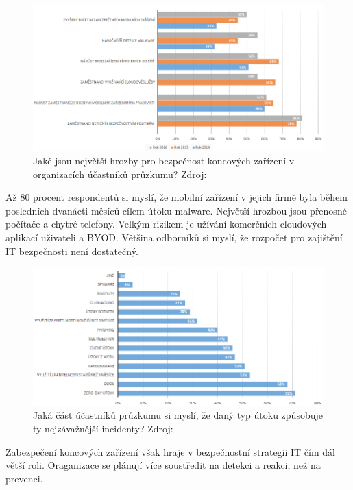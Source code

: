 \begin{figure}[h!]\label{hrozby}
\centering
\includegraphics[width=14cm]{img/hrozby}
\caption{Jaké jsou největší hrozby pro bezpečnost koncových zařízení v organizacích účastníků průzkumu? Zdroj: } 
\end{figure}

Až 80 procent respondentů si myslí, že mobilní zařízení v jejich firmě byla během posledních dvanácti měsíců cílem útoku malware. Největší hrozbou jsou přenosné počítače a chytré telefony. Velkým rizikem je užívání komerčních cloudových aplikací uživateli a BYOD. Většina odborníků si myslí, že rozpočet pro zajištění IT bezpečnosti není dostatečný. 

\begin{figure}[h!]\label{hrozbyUtoky}
\centering
\includegraphics[width=14cm]{img/hrozbyUtoky}
\caption{Jaká část účastníků průzkumu si myslí, že daný typ útoku způsobuje ty nejzávažnější incidenty? Zdroj: } 
\end{figure}

Zabezpečení koncových zařízení však hraje v bezpečnostní strategii IT čím dál větší roli. Oraganizace se plánují více soustředit na detekci a reakci, než na prevenci. 





